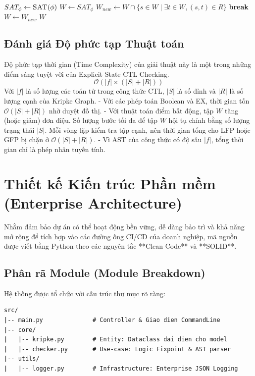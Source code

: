 \documentclass[12pt,a4paper]{article}
\begin{document}
\begin{algorithm}[H]
\caption{Tính toán $SAT(EG \ \phi)$ bằng GFP}\label{alg:eg}
\begin{algorithmic}[1]
\State $SAT_{\phi} \gets \Call{SAT}{\phi}$
\State $W \gets SAT_{\phi}$ 
\Loop
    \State $W_{new} \gets W \cap \{s \in W \mid \exists t \in W, (s,t) \in R \}$
        \State \textbf{break} 
    \EndIf
    \State $W \gets W_{new}$
\EndLoop
\State \Return $W$
\end{algorithmic}
\end{algorithm}

\subsection{Đánh giá Độ phức tạp Thuật toán}
Độ phức tạp thời gian (Time Complexity) của giải thuật này là một trong những điểm sáng tuyệt vời của Explicit State CTL Checking. 
\begin{equation}
    \mathcal{O}(|f| \times (|S| + |R|))
\end{equation}
Với $|f|$ là số lượng các toán tử trong công thức CTL, $|S|$ là số đỉnh và $|R|$ là số lượng cạnh của Kripke Graph.
- Với các phép toán Boolean và EX, thời gian tốn $\mathcal{O}(|S| + |R|)$ nhờ duyệt đồ thị.
- Với thuật toán điểm bất động, tập $W$ tăng (hoặc giảm) đơn điệu. Số lượng bước tối đa để tập $W$ hội tụ chính bằng số lượng trạng thái $|S|$. Mỗi vòng lặp kiểm tra tập cạnh, nên thời gian tổng cho LFP hoặc GFP bị chặn ở $\mathcal{O}(|S| + |R|)$.
- Vì AST của công thức có độ sâu $|f|$, tổng thời gian chỉ là phép nhân tuyến tính.

\newpage
\section{Thiết kế Kiến trúc Phần mềm (Enterprise Architecture)}

Nhằm đảm bảo dự án có thể hoạt động bền vững, dễ dàng bảo trì và khả năng mở rộng để tích hợp vào các đường ống CI/CD của doanh nghiệp, mã nguồn được viết bằng Python theo các nguyên tắc **Clean Code** và **SOLID**.

\subsection{Phân rã Module (Module Breakdown)}
Hệ thống được tổ chức với cấu trúc thư mục rõ ràng:
\begin{lstlisting}[caption=Cấu trúc cây thư mục mã nguồn]
src/
|-- main.py              # Controller & Giao dien CommandLine 
|-- core/
|   |-- kripke.py        # Entity: Dataclass dai dien cho model
|   |-- checker.py       # Use-case: Logic Fixpoint & AST parser
|-- utils/
|   |-- logger.py        # Infrastructure: Enterprise JSON Logging
\end{lstlisting}
\end{document}

